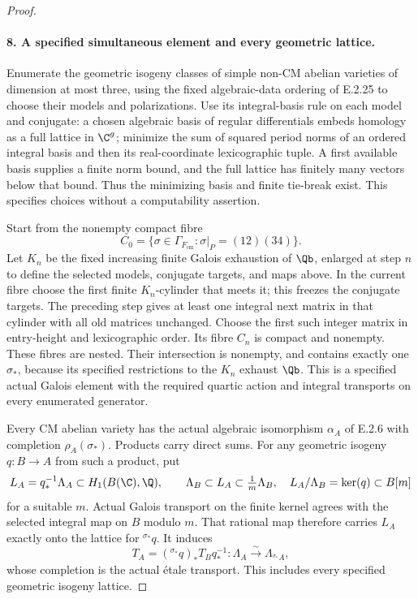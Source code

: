 \begin{proof}
\paragraph{8. A specified simultaneous element and every geometric lattice.}
Enumerate the geometric isogeny classes of
simple non-CM abelian varieties of dimension
at most three, using the fixed algebraic-data
ordering of E.2.25 to choose their models
and polarizations. Use its integral-basis
rule on each model and conjugate: a chosen
algebraic basis of regular differentials
embeds homology as a full lattice in
\(\C^g\); minimize the sum of squared
period norms of an ordered integral basis
and then its real-coordinate lexicographic
tuple. A first available basis supplies a
finite norm bound, and the full lattice
has finitely many vectors below that bound.
Thus the minimizing basis and finite
tie-break exist. This specifies choices
without a computability assertion.

Start from the nonempty compact fibre
\[
 C_0=\{\sigma\in\Gamma_{F_{\mathrm{cm}}}:
                  \sigma|_P=(12)(34)\}.
\]
Let \(K_n\) be the fixed increasing finite
Galois exhaustion of \(\Qb\), enlarged
at step \(n\) to define the selected
models, conjugate targets, and maps above.
In the current fibre choose the first
finite \(K_n\)-cylinder that meets it;
this freezes the conjugate targets. The
preceding step gives at least one integral
next matrix in that cylinder with all old
matrices unchanged. Choose the first such
integer matrix in entry-height and
lexicographic order. Its fibre \(C_n\)
is compact and nonempty. These fibres are
nested. Their intersection is nonempty,
and contains exactly one \(\sigma_*\),
because its specified restrictions to
the \(K_n\) exhaust \(\Qb\).
This is a specified actual Galois element
with the required quartic action and
integral transports on every enumerated
generator.

Every CM abelian variety has the actual
algebraic isomorphism \(\alpha_A\) of
E.2.6 with completion \(\rho_A(\sigma_*)\).
Products carry direct sums. For any
geometric isogeny \(q:B\to A\) from
such a product, put
\[
 L_A=q_*^{-1}\Lambda_A\subset H_1(B(\C),\Q),
 \qquad \Lambda_B\subset L_A\subset\tfrac1m\Lambda_B,
 \quad L_A/\Lambda_B=\ker(q)\subset B[m]
\]
for a suitable \(m\). Actual Galois
transport on the finite kernel agrees
with the selected integral map on \(B\)
modulo \(m\). That rational map
therefore carries \(L_A\) exactly onto
the lattice for \({}^{\sigma_*}q\).
It induces
\[
 T_A=({}^{\sigma_*}q)_*T_Bq_*^{-1}:
     \Lambda_A\xrightarrow{\sim}
     \Lambda_{{}^{\sigma_*}A},
 \tag{E.2.26r}
\]
whose completion is the actual
\'{e}tale transport. This includes every
specified geometric isogeny lattice.


\end{proof}
